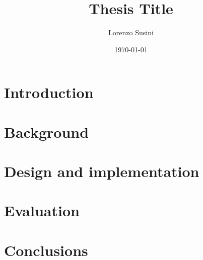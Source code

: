 \documentclass[12pt]{report}
\title{Thesis Title}
\author{Lorenzo Susini}
\date{\today}
\begin{document}


\doublespacing



\tableofcontents

\chapter{Introduction}
\label{chap:intro}


\chapter{Background}
\label{chap:background}


\chapter{Design and implementation}
\label{chap:design-impl}


\chapter{Evaluation}
\label{chap:testing}


\chapter{Conclusions}
\label{chap:conclusions}


\listoffigures


\lstlistoflistings

\printbibliography

\newpage

\end{document}
